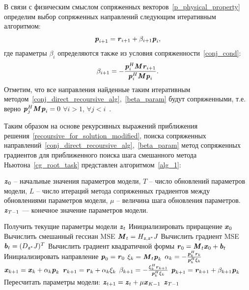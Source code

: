 В связи с физическим смыслом сопряженных векторов~\eqref{p_physical_property} определим выбор сопряженных направлений следующим итеративным алгоритмом:
\begin{equation}
	\textbf{\textit{p}}_{i+1}=\textbf{\textit{r}}_{i+1}+\beta_{i+1}\textbf{\textit{p}}_i,
	\label{conj_direct_recoursive_alg}
\end{equation}
где параметры $\beta_i$ определяются также из условия сопряженности~\eqref{conj_cond}:
\begin{equation}
	\beta_{i+1}=-\frac{\textbf{\textit{p}}_{i}^H\textbf{\textit{M}}\textbf{\textit{r}}_{i+1}}{\textbf{\textit{p}}_{i}^H\textbf{\textit{M}}\textbf{\textit{p}}_{i}}.
	\label{beta_param}
\end{equation}
Отметим, что все направления найденные таким итеративным методом~\eqref{conj_direct_recoursive_alg},~\eqref{beta_param} будут сопряженными, т.е. верно $\textbf{\textit{p}}_j^H\textbf{\textit{M}}\textbf{\textit{p}}_i=0$ $\forall i>1$, $\forall j<i$~\cite{HestenesStiefel1952}.

Таким образом на основе рекурсивных выражений приближения решения~\eqref{recoursive_for_solution_modified}, поиска сопряженных направлений~\eqref{conj_direct_recoursive_alg},~\eqref{beta_param} метод сопряженных градиентов для приближенного поиска шага смешанного метода Ньютона~\eqref{cg_root_task} представлен алгоритмом~\ref{alg_1}:

\begin{algorithm}[ht!]
	\caption{Метод сопряженных градиентов}
	\begin{algorithmic}[1]
		\REQUIRE $\textbf{\textit{z}}_0$ -- начальные значения параметров модели, $T$ -- число обновлений параметров модели, $L$ -- число итераций метода сопряженных градиентов между обновлениями параметров модели, $\mu$ -- величина шага обновления параметров.
		\ENSURE $\textbf{\textit{z}}_{T-1}$ — конечное значение параметров модели.
		
		\STATE Получить текущие параметры модели $\textbf{\textit{z}}_t$
		\STATE Инициализировать приращение $\textbf{\textit{x}}_0$
		\STATE Вычислить смешанный гессиан MSE $\textbf{\textit{M}}_t=H_{\textbf{\textit{z}}, \textbf{\textit{z}}^*}J$
		\STATE Вычислить градиент MSE $\textbf{\textit{b}}_t=(D_{\textbf{\textit{z}}^*}J)^T$
		\STATE Вычислить градиент квадратичной формы $\textbf{\textit{r}}_0=\textbf{\textit{M}}_t\textbf{\textit{x}}_0+\textbf{\textit{b}}_t$
		\STATE Инициализировать направление $\textbf{\textit{p}}_0=\textbf{\textit{r}}_0$
		\STATE $\xi_k=\textbf{\textit{M}}_t\textbf{\textit{p}}_k$
		\STATE $\alpha_k=-\frac{\textbf{\textit{p}}_k^H\textbf{\textit{r}}_k}{\textbf{\textit{p}}_k^H\xi_k}$
		\STATE $\textbf{\textit{x}}_{k+1}=\textbf{\textit{x}}_{k}+\alpha_k\textbf{\textit{p}}_k$
		\STATE $\textbf{\textit{r}}_{k+1}=\textbf{\textit{r}}_k+\alpha_k\xi_k$
		\STATE $\beta_{k+1}=-\frac{\xi_k^H\textbf{\textit{r}}_{k+1}}{\textbf{\textit{p}}_{k}^H\xi_k}$
		\STATE $\textbf{\textit{p}}_{k+1}=\textbf{\textit{r}}_{k+1}+\beta_{k+1}\textbf{\textit{p}}_k$
		\ENDFOR
		\STATE Пересчитать параметры модели: $\textbf{\textit{z}}_{t+1}=\textbf{\textit{z}}_t+\mu\textbf{\textit{x}}_{K-1}$
		\ENDFOR
		\STATE \RETURN $\textbf{\textit{z}}_{T-1}$
	\end{algorithmic}
	\label{alg_1}
\end{algorithm}

